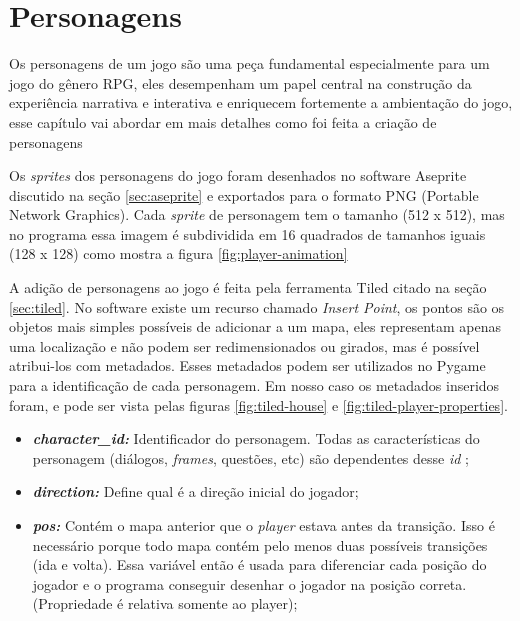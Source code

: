 \clearpage
\section{Personagens}
\label{sec:personagens}
Os personagens de um jogo são uma peça fundamental especialmente para um jogo do gênero RPG, eles desempenham um papel central na construção da experiência narrativa e interativa e enriquecem fortemente a ambientação do jogo, esse capítulo vai abordar em mais detalhes como foi feita a criação de personagens

Os \textit{sprites} dos personagens do jogo foram desenhados no software Aseprite discutido na seção \ref{sec:aseprite} e exportados para o formato PNG (Portable Network Graphics). Cada \textit{sprite} de personagem tem o tamanho (512 x 512), mas no programa essa imagem é subdividida em 16 quadrados de tamanhos iguais (128 x 128) como mostra a figura \ref{fig:player-animation}

A adição de personagens ao jogo é feita pela ferramenta Tiled citado na seção \ref{sec:tiled}. No software existe um recurso chamado \textit{Insert Point}, os pontos são os objetos mais simples possíveis de adicionar a um mapa, eles representam apenas uma localização e não podem ser redimensionados ou girados, mas é possível atribui-los com metadados. Esses metadados podem ser utilizados no Pygame para a identificação de cada personagem. Em nosso caso os metadados inseridos foram, e pode ser vista pelas figuras \ref{fig:tiled-house} e \ref{fig:tiled-player-properties}.
\begin{itemize}
    \item \textbf{\textit{character\_id: }} Identificador do personagem. Todas as características do personagem (diálogos, \textit{frames}, questões, etc) são dependentes desse \textit{id} ;
    \item \textbf{\textit{direction: }}Define qual é a direção inicial do jogador;
    \item \textbf{\textit{pos: }} Contém o mapa anterior que o \textit{player} estava antes da transição. Isso é necessário porque todo mapa contém pelo menos duas possíveis transições (ida e volta). Essa variável então é usada para diferenciar cada posição do jogador e o programa conseguir desenhar o jogador na posição correta. (Propriedade é relativa somente ao player);
\end{itemize}

